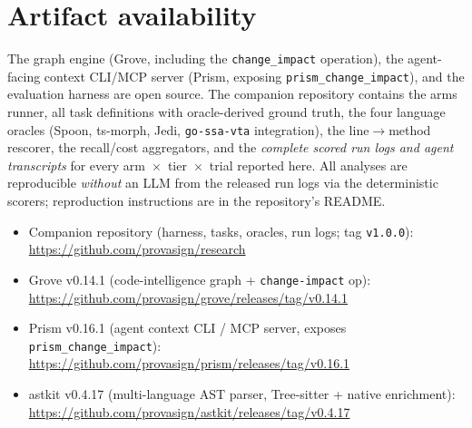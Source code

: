\documentclass[11pt]{article}
\newcommand{\code}[1]{\texttt{#1}}
\begin{document}
\section*{Artifact availability}
\label{sec:artifacts}
The graph engine (Grove, including the \code{change\_impact} operation), the
agent-facing context CLI/MCP server (Prism, exposing
\code{prism\_change\_impact}), and the evaluation harness are open source. The
companion repository contains the arms runner, all task definitions with
oracle-derived ground truth, the four language oracles (Spoon, ts-morph, Jedi,
\code{go-ssa-vta} integration), the line$\rightarrow$method rescorer, the
recall/cost aggregators, and the \emph{complete scored run logs and agent
transcripts} for every arm~$\times$~tier~$\times$~trial reported here. All
analyses are reproducible \emph{without} an LLM from the released run logs via
the deterministic scorers; reproduction instructions are in the repository's
README.
\begin{itemize}[leftmargin=*]
\item Companion repository (harness, tasks, oracles, run logs; tag \code{v1.0.0}):\\
  \url{https://github.com/provasign/research}
\item Grove v0.14.1 (code-intelligence graph + \code{change-impact} op):\\
  \url{https://github.com/provasign/grove/releases/tag/v0.14.1}
\item Prism v0.16.1 (agent context CLI / MCP server, exposes \code{prism\_change\_impact}):\\
  \url{https://github.com/provasign/prism/releases/tag/v0.16.1}
\item astkit v0.4.17 (multi-language AST parser, Tree-sitter + native enrichment):\\
  \url{https://github.com/provasign/astkit/releases/tag/v0.4.17}
\end{itemize}
\end{document}
